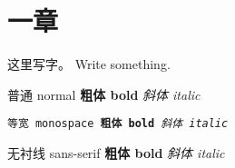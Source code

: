 \section{一章}

这里写字。 Write something.

普通 normal \textbf{粗体 bold} \textit{斜体 italic}

\texttt{等宽 monospace \textbf{粗体 bold} \textit{斜体 italic}}

\textsf{无衬线 sans-serif \textbf{粗体 bold} \textit{斜体 italic}}
